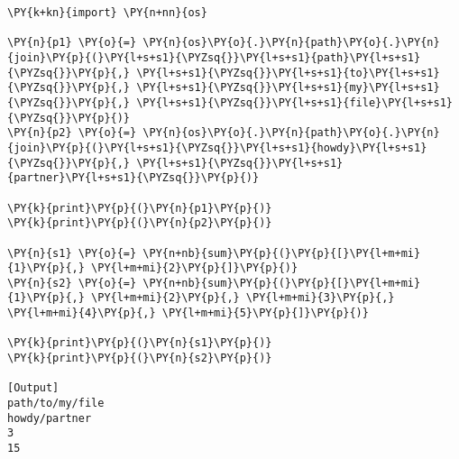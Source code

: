 \begin{Verbatim}[label=\makebox{\url{https://bitbucket.org/lbaldini/programming/src/tip/snippets/func\_variadic1.py}},commandchars=\\\{\}]
\PY{k+kn}{import} \PY{n+nn}{os}

\PY{n}{p1} \PY{o}{=} \PY{n}{os}\PY{o}{.}\PY{n}{path}\PY{o}{.}\PY{n}{join}\PY{p}{(}\PY{l+s+s1}{\PYZsq{}}\PY{l+s+s1}{path}\PY{l+s+s1}{\PYZsq{}}\PY{p}{,} \PY{l+s+s1}{\PYZsq{}}\PY{l+s+s1}{to}\PY{l+s+s1}{\PYZsq{}}\PY{p}{,} \PY{l+s+s1}{\PYZsq{}}\PY{l+s+s1}{my}\PY{l+s+s1}{\PYZsq{}}\PY{p}{,} \PY{l+s+s1}{\PYZsq{}}\PY{l+s+s1}{file}\PY{l+s+s1}{\PYZsq{}}\PY{p}{)}
\PY{n}{p2} \PY{o}{=} \PY{n}{os}\PY{o}{.}\PY{n}{path}\PY{o}{.}\PY{n}{join}\PY{p}{(}\PY{l+s+s1}{\PYZsq{}}\PY{l+s+s1}{howdy}\PY{l+s+s1}{\PYZsq{}}\PY{p}{,} \PY{l+s+s1}{\PYZsq{}}\PY{l+s+s1}{partner}\PY{l+s+s1}{\PYZsq{}}\PY{p}{)}

\PY{k}{print}\PY{p}{(}\PY{n}{p1}\PY{p}{)}
\PY{k}{print}\PY{p}{(}\PY{n}{p2}\PY{p}{)}

\PY{n}{s1} \PY{o}{=} \PY{n+nb}{sum}\PY{p}{(}\PY{p}{[}\PY{l+m+mi}{1}\PY{p}{,} \PY{l+m+mi}{2}\PY{p}{]}\PY{p}{)}
\PY{n}{s2} \PY{o}{=} \PY{n+nb}{sum}\PY{p}{(}\PY{p}{[}\PY{l+m+mi}{1}\PY{p}{,} \PY{l+m+mi}{2}\PY{p}{,} \PY{l+m+mi}{3}\PY{p}{,} \PY{l+m+mi}{4}\PY{p}{,} \PY{l+m+mi}{5}\PY{p}{]}\PY{p}{)}

\PY{k}{print}\PY{p}{(}\PY{n}{s1}\PY{p}{)}
\PY{k}{print}\PY{p}{(}\PY{n}{s2}\PY{p}{)}

[Output]
path/to/my/file
howdy/partner
3
15
\end{Verbatim}